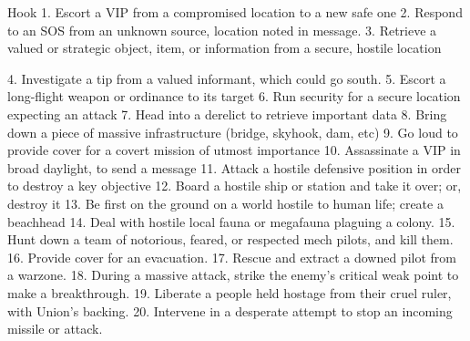 Hook
    1.  Escort a VIP from a compromised location to a new safe one
    2.  Respond to an SOS from an unknown source, location noted in message.
    3.  Retrieve a valued or strategic object, item, or information from a secure, hostile location




    4.  Investigate a tip from a valued informant, which could go south.
    5.  Escort a long-flight weapon or ordinance to its target
    6.  Run security for a secure location expecting an attack
    7.  Head into a derelict to retrieve important data
    8.  Bring down a piece of massive infrastructure (bridge, skyhook, dam, etc)
    9.  Go loud to provide cover for a covert mission of utmost importance
    10. Assassinate a VIP in broad daylight, to send a message
    11. Attack a hostile defensive position in order to destroy a key objective
    12. Board a hostile ship or station and take it over; or, destroy it
    13. Be first on the ground on a world hostile to human life; create a beachhead
    14. Deal with hostile local fauna or megafauna plaguing a colony.
    15. Hunt down a team of notorious, feared, or respected mech pilots, and kill them.
    16. Provide cover for an evacuation.
    17. Rescue and extract a downed pilot from a warzone.
    18. During a massive attack, strike the enemy's critical weak point to make a breakthrough.
    19. Liberate a people held hostage from their cruel ruler, with Union's backing.
    20. Intervene in a desperate attempt to stop an incoming missile or attack.

